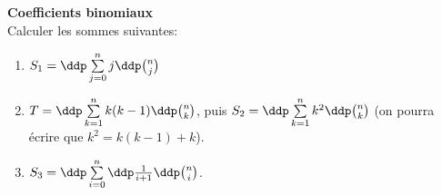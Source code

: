 
\begin{exercice} \; \textbf{Coefficients binomiaux} \\
Calculer les sommes suivantes: 
\begin{enumerate}
\item $S_1 = \ddp \sum\limits_{j=0}^n j\ddp \binom{n}{j}$
\item $T = \ddp \sum\limits_{k=1}^n k(k-1)\ddp \binom{n}{k}$, puis $S_2 = \ddp \sum\limits_{k=1}^n k^2\ddp \binom{n}{k}$ (on pourra \'ecrire que $k^2=k(k-1)+k$).
\item $S_3= \ddp \sum\limits_{i=0}^n \ddp\frac{1}{i+1}\ddp \binom{n}{i}$.
\end{enumerate}
\end{exercice}